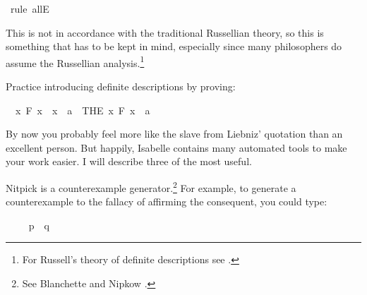 \begin{isabellebody}
\ {\isacharparenleft}rule\ allE{\isacharparenright}\isanewline
{}\isamarkupfalse%
%
\endisatagproof
{\isafoldproof}%
%
\isadelimproof
%
\endisadelimproof
%
\begin{isamarkuptext}%
This is not in accordance with the traditional Russellian theory, so this is something that
has to be kept in mind, especially since many philosophers do assume the Russellian analysis.\footnote{
For Russell's theory of definite descriptions see \cite{russell_denoting_1905}.}%
\end{isamarkuptext}\isamarkuptrue%
%
\begin{isamarkuptext}%
\begin{Exercise} Practice introducing definite descriptions by proving: \end{Exercise}%
\end{isamarkuptext}\isamarkuptrue%
\isamarkupfalse%
\ {\isachardoublequoteopen}{\isacharparenleft}{\isasymforall}\ x{\isachardot}\ F\ x\ {\isasymlongleftrightarrow}\ x\ {\isacharequal}\ a{\isacharparenright}\ {\isasymlongrightarrow}\ {\isacharparenleft}THE\ x{\isachardot}\ F\ x{\isacharparenright}\ {\isacharequal}\ a{\isachardoublequoteclose}%
\isadelimproof
\ %
\endisadelimproof
%
\isatagproof
{}\isamarkupfalse%
%
\endisatagproof
{\isafoldproof}%
%
\isadelimproof
%
\endisadelimproof
%
\isadelimdocument
%
\endisadelimdocument
%
\isatagdocument
%
\isamarkuptrue%
%
\endisatagdocument
{\isafolddocument}%
%
\isadelimdocument
%
\endisadelimdocument
%
\begin{isamarkuptext}%
By now you probably feel more like the slave from Liebniz' quotation than an excellent person.
But happily, Isabelle contains many automated tools to make your work easier. I will describe three of
the most useful.%
\end{isamarkuptext}\isamarkuptrue%
%
\isadelimdocument
%
\endisadelimdocument
%
\isatagdocument
%
\isamarkuptrue%
%
\endisatagdocument
{\isafolddocument}%
%
\isadelimdocument
%
\endisadelimdocument
%
\begin{isamarkuptext}%
Nitpick is a counterexample generator.\footnote{See Blanchette and Nipkow \cite{blanchette_nitpick_2010}.} 
For example, to generate a counterexample to the fallacy of affirming the consequent, you could type:%
\end{isamarkuptext}\isamarkuptrue%
\isamarkupfalse%
\ \isanewline
\ \ \ {\isachardoublequoteopen}p\ {\isasymlongrightarrow}\ q{\isachardoublequoteclose}\isanewline

\end{isabellebody}
